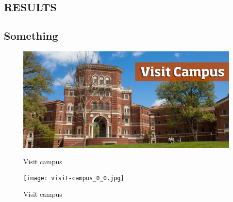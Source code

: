
\begin{center}
\section{RESULTS}
\label{sec:Results}
\end{center}
\noindent
	\lipsum[1]
\indent \lipsum[2-4]
    \belowSubSecSkip
\subsection{Something}
\label{sec:Results-ThinFilms}


\noindent
	\indent \lipsum[1]

\begin{figure}[h]
	\centering	
	\includegraphics[width=0.75\linewidth]{./Figures/visit-campus_0_0.jpg}
	\caption{Visit campus}
	\protect\label{visit-campus-1}
\end{figure}

\begin{figure}[h]
	\centering	
	\texttt{[image: visit-campus\_0\_0.jpg]}
	\caption{Visit campus}
	\protect\label{visit-campus-2}
\end{figure}

\newpage
\clearpage

